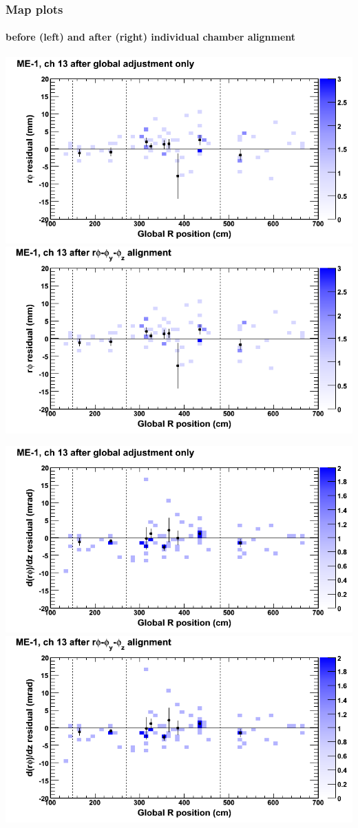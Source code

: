 \documentclass[compress]{beamer}
\begin{document}
\begin{frame}
\frametitle{Map plots}
\framesubtitle{before (left) and after (right) individual chamber alignment}
\includegraphics[width=0.5\linewidth]{ringmapplots_3dof/before_CSCvsr_mem1ch13_x.png} \includegraphics[width=0.5\linewidth]{ringmapplots_3dof/after_CSCvsr_mem1ch13_x.png}

\includegraphics[width=0.5\linewidth]{ringmapplots_3dof/before_CSCvsr_mem1ch13_dxdz.png} \includegraphics[width=0.5\linewidth]{ringmapplots_3dof/after_CSCvsr_mem1ch13_dxdz.png}
\end{frame}
\end{document}
